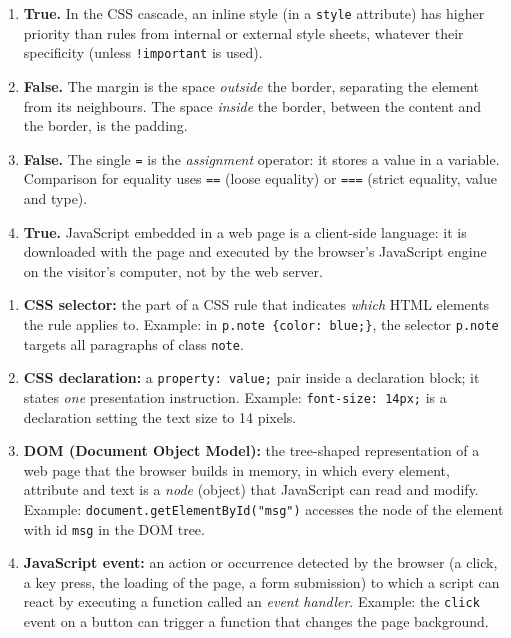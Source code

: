 \documentclass[11pt]{article}
\newcommand{\cle}[1]{{\popxbold\color{popdark}#1}}
\begin{document}
\begin{corrige}
\begin{enumerate}
\item \textbf{True.} In the CSS cascade, an inline style (in a \texttt{style} attribute) has higher priority than rules from internal or external style sheets, whatever their specificity (unless \texttt{!important} is used).
\item \textbf{False.} The margin is the space \emph{outside} the border, separating the element from its neighbours. The space \emph{inside} the border, between the content and the border, is the \cle{padding}.
\item \textbf{False.} The single \texttt{=} is the \emph{assignment} operator: it stores a value in a variable. Comparison for equality uses \texttt{==} (loose equality) or \texttt{===} (strict equality, value and type).
\item \textbf{True.} JavaScript embedded in a web page is a \cle{client-side} language: it is downloaded with the page and executed by the browser's JavaScript engine on the visitor's computer, not by the web server.
\end{enumerate}
\end{corrige}

\begin{corrige}
\begin{enumerate}
\item \textbf{CSS selector:} the part of a CSS rule that indicates \emph{which} HTML elements the rule applies to. Example: in \texttt{p.note \{color: blue;\}}, the selector \texttt{p.note} targets all paragraphs of class \texttt{note}.
\item \textbf{CSS declaration:} a \texttt{property: value;} pair inside a declaration block; it states \emph{one} presentation instruction. Example: \texttt{font-size: 14px;} is a declaration setting the text size to 14 pixels.
\item \textbf{DOM (Document Object Model):} the tree-shaped representation of a web page that the browser builds in memory, in which every element, attribute and text is a \emph{node} (object) that JavaScript can read and modify. Example: \texttt{document.getElementById("msg")} accesses the node of the element with id \texttt{msg} in the DOM tree.
\item \textbf{JavaScript event:} an action or occurrence detected by the browser (a click, a key press, the loading of the page, a form submission) to which a script can react by executing a function called an \emph{event handler}. Example: the \texttt{click} event on a button can trigger a function that changes the page background.
\end{enumerate}
\end{corrige}
\end{document}

